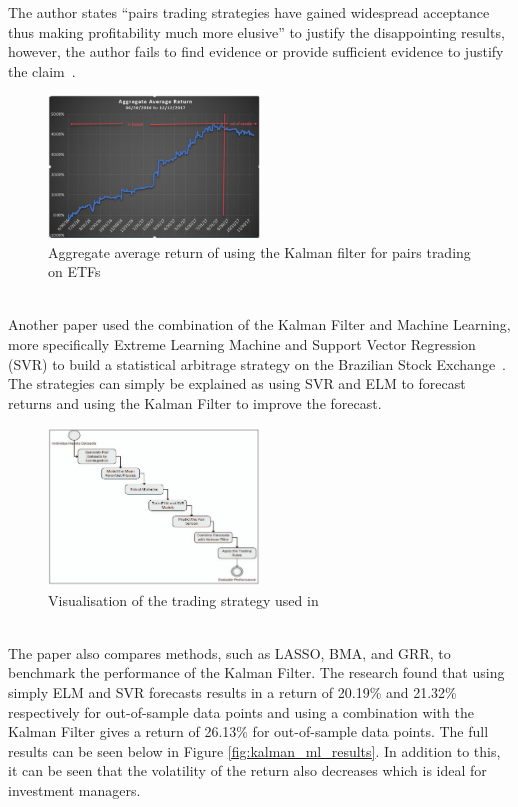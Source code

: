 \noindent The author states ``pairs trading strategies have gained widespread acceptance thus making profitability much more elusive'' to justify the disappointing results, however, the author fails to find evidence or provide sufficient evidence to justify the claim~\cite{dempsey_market_2017}.
\begin{figure}[htb!]
    \centering
    \includegraphics[width=0.5\textwidth]{background/Images/insamplevsoutsampleresults.png}
    \caption{Aggregate average return of using the Kalman filter for pairs trading on ETFs~\cite{dempsey_market_2017}}
    \label{fig:kalman_results}
\end{figure}
\\[5mm]
Another paper used the combination of the Kalman Filter and Machine Learning, more specifically Extreme Learning Machine and Support Vector Regression (SVR) to build a statistical arbitrage strategy on the Brazilian Stock Exchange~\cite{6974093}. The strategies can simply be explained as using SVR and ELM to forecast returns and using the Kalman Filter to improve the forecast.
\begin{figure}[htb!]
    \centering
    \includegraphics[width=0.5\textwidth]{background/Images/KalmanMLFlowChart.png}
    \caption{Visualisation of the trading strategy used in \cite{6974093}}
    \label{fig:kalman_ml_flowchart}
\end{figure}
\\[5mm]
The paper also compares methods, such as LASSO, BMA, and GRR, to benchmark the performance of the Kalman Filter. The research found that using simply ELM and SVR forecasts results in a return of 20.19\% and 21.32\% respectively for out-of-sample data points and using a combination with the Kalman Filter gives a return of 26.13\% for out-of-sample data points. The full results can be seen below in Figure \ref{fig:kalman_ml_results}. In addition to this, it can be seen that the volatility of the return also decreases which is ideal for investment managers.

